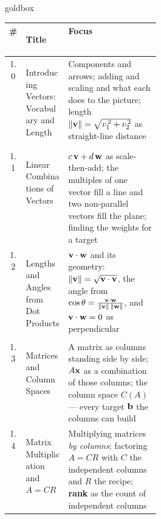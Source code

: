 \vspace{0.13in}

\renewcommand{\arraystretch}{1.32}
\begin{skillbox}{goldbox}
\begin{tabularx}{\linewidth}{@{} c >{\bfseries\raggedright\arraybackslash}p{0.29\linewidth} X @{}}
  \textbf{\#} & \textbf{Title} & \textbf{Focus} \\
  \hline
  1.0 & Introducing Vectors: Vocabulary and Length
    & Components and arrows; adding and scaling and what each does to the picture;
      length $\|\mathbf{v}\| = \sqrt{v_1^{\,2}+v_2^{\,2}}$ as straight-line distance \\
  \hline
  1.1 & Linear Combinations of Vectors
    & $c\,\mathbf{v} + d\,\mathbf{w}$ as scale-then-add; the multiples of one vector fill a line and
      two non-parallel vectors fill the plane; finding the weights for a target \\
  \hline
  1.2 & Lengths and Angles from Dot Products
    & $\mathbf{v}\cdot\mathbf{w}$ and its geometry: $\|\mathbf{v}\| = \sqrt{\mathbf{v}\cdot\mathbf{v}}$, the angle from
      $\cos\theta = \frac{\mathbf{v}\cdot\mathbf{w}}{\|\mathbf{v}\|\,\|\mathbf{w}\|}$, and $\mathbf{v}\cdot\mathbf{w} = 0$ as
      perpendicular \\
  \hline
  1.3 & Matrices and Column Spaces
    & A matrix as columns standing side by side; $A\mathbf{x}$ as a combination of those columns;
      the column space $C(A)$ --- every target $\mathbf{b}$ the columns can build \\
  \hline
  1.4 & Matrix Multiplication and $A = CR$
    & Multiplying matrices \emph{by columns}; factoring $A = CR$ with $C$ the independent
      columns and $R$ the recipe; \textbf{rank} as the count of independent columns \\
  \hline
\end{tabularx}
\end{skillbox}

\vspace{0.11in}

